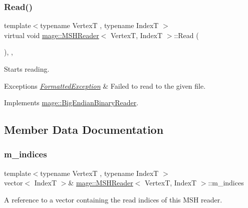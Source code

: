 \subsubsection{\texorpdfstring{Read()}{Read()}}
{\footnotesize\ttfamily template$<$typename VertexT , typename IndexT $>$ \\
virtual void \hyperlink{classmage_1_1_m_s_h_reader}{mage\+::\+M\+S\+H\+Reader}$<$ VertexT, IndexT $>$\+::Read (\begin{DoxyParamCaption}{ }\end{DoxyParamCaption})\hspace{0.3cm}{\ttfamily [override]}, {\ttfamily [private]}, {\ttfamily [virtual]}}

Starts reading.


\begin{DoxyExceptions}{Exceptions}
{\em \hyperlink{classmage_1_1_formatted_exception}{Formatted\+Exception}} & Failed to read to the given file. \\
\hline
\end{DoxyExceptions}


Implements \hyperlink{classmage_1_1_big_endian_binary_reader_af072965dea0319d6366b21cc6562bbf9}{mage\+::\+Big\+Endian\+Binary\+Reader}.



\subsection{Member Data Documentation}
\hypertarget{classmage_1_1_m_s_h_reader_ae96b703b052eb9951872683e17ab11ae}{}\label{classmage_1_1_m_s_h_reader_ae96b703b052eb9951872683e17ab11ae} 
\subsubsection{\texorpdfstring{m\+\_\+indices}{m\_indices}}
{\footnotesize\ttfamily template$<$typename VertexT , typename IndexT $>$ \\
vector$<$ IndexT $>$\& \hyperlink{classmage_1_1_m_s_h_reader}{mage\+::\+M\+S\+H\+Reader}$<$ VertexT, IndexT $>$\+::m\+\_\+indices\hspace{0.3cm}{\ttfamily [private]}}

A reference to a vector containing the read indices of this M\+SH reader. \hypertarget{classmage_1_1_m_s_h_reader_a6b4c0fbf02771cb7bc0ebcb685c3c30b}{}\label{classmage_1_1_m_s_h_reader_a6b4c0fbf02771cb7bc0ebcb685c3c30b} 
